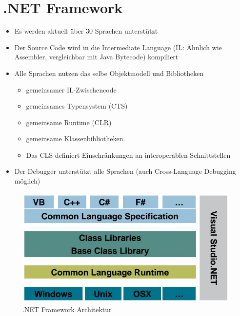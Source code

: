 \section{.NET Framework}
\begin{itemize}
	\item Es werden aktuell über 30 Sprachen unterstützt
	\item Der Source Code wird in die Intermediate Language  (IL: Ähnlich wie Assembler, vergleichbar mit Java Bytecode) kompiliert
	\item Alle Sprachen nutzen das selbe Objektmodell und Bibliotheken
	\begin{itemize}
		\item gemeinsamer IL-Zwischencode
		\item gemeinsames Typensystem (CTS)
		\item gemeinsame Runtime (CLR)
		\item gemeinsame Klassenbibliotheken.
		\item Das CLS definiert Einschränkungen an interoperablen Schnittstellen
	\end{itemize}
	\item Der Debugger unterstützt alle Sprachen (auch Cross-Language Debugging möglich)
\end{itemize}
\begin{figure}[h]
\centering
\includegraphics[width=0.6\linewidth]{images/net_framework_architektur}
\caption{.NET Framework Architektur}
\label{fig:netframeworkarchitektur}
\end{figure}

